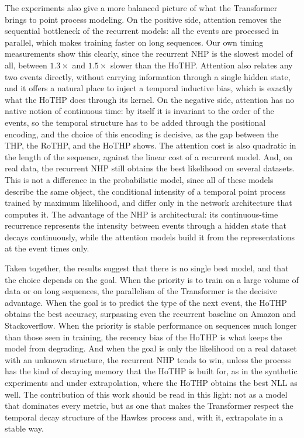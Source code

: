 The experiments also give a more balanced picture of what the Transformer brings to point process modeling. On the positive side, attention removes the sequential bottleneck of the recurrent models: all the events are processed in parallel, which makes training faster on long sequences. Our own timing measurements show this clearly, since the recurrent NHP is the slowest model of all, between $1.3\times$ and $1.5\times$ slower than the HoTHP. Attention also relates any two events directly, without carrying information through a single hidden state, and it offers a natural place to inject a temporal inductive bias, which is exactly what the HoTHP does through its kernel. On the negative side, attention has no native notion of continuous time: by itself it is invariant to the order of the events, so the temporal structure has to be added through the positional encoding, and the choice of this encoding is decisive, as the gap between the THP, the RoTHP, and the HoTHP shows. The attention cost is also quadratic in the length of the sequence, against the linear cost of a recurrent model. And, on real data, the recurrent NHP still obtains the best likelihood on several datasets. This is not a difference in the probabilistic model, since all of these models describe the same object, the conditional intensity of a temporal point process trained by maximum likelihood, and differ only in the network architecture that computes it. The advantage of the NHP is architectural: its continuous-time recurrence represents the intensity between events through a hidden state that decays continuously, while the attention models build it from the representations at the event times only.

Taken together, the results suggest that there is no single best model, and that the choice depends on the goal. When the priority is to train on a large volume of data or on long sequences, the parallelism of the Transformer is the decisive advantage. When the goal is to predict the type of the next event, the HoTHP obtains the best accuracy, surpassing even the recurrent baseline on Amazon and Stackoverflow. When the priority is stable performance on sequences much longer than those seen in training, the recency bias of the HoTHP is what keeps the model from degrading. And when the goal is only the likelihood on a real dataset with an unknown structure, the recurrent NHP tends to win, unless the process has the kind of decaying memory that the HoTHP is built for, as in the synthetic experiments and under extrapolation, where the HoTHP obtains the best NLL as well. The contribution of this work should be read in this light: not as a model that dominates every metric, but as one that makes the Transformer respect the temporal decay structure of the Hawkes process and, with it, extrapolate in a stable way.

